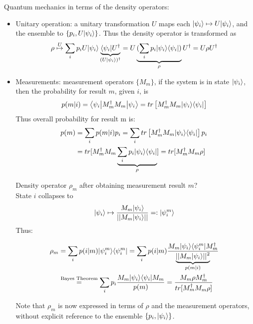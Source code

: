 Quantum mechanics in terms of the density operators:
\begin{itemize}
    \item Unitary operation: a unitary transformation $U$ maps each
    $\lvert\psi_i\rangle \mapsto U \lvert\psi_i\rangle$, and the ensemble to  $\{p_i, U \lvert\psi_i\rangle \}$.
    Thus the density operator is transformed as 
    \begin{equation}
        \rho \stackrel{U}{\mapsto} \sum_i p_i U \lvert\psi_i\rangle 
            \underbrace{\langle\psi_i\rvert U^\dag}_{(U\lvert\psi_i\rangle)^\dag} 
        = U \underbrace{(\sum_i p_i \lvert\psi_i\rangle \langle\psi_i\rvert)}_{\rho} U^\dag 
        = U \rho U^\dag
    \end{equation}

    \item Measurements: measurement operators $\{M_m\}$, if the system is in state
    $\lvert\psi_i\rangle$, then the probability for result $m$, given $i$, is 
    \begin{equation}
        p(m|i) = \left \langle \psi_i \middle| M_m^\dag M_m \middle| \psi_i \right \rangle = 
            tr \left[ M_m^\dag M_m \lvert\psi_i\rangle \langle\psi_i\rvert \right]
    \end{equation}
    Thus overall probability for result m is:
    \begin{align}
        p(m) &= \sum_i p(m|i) p_i = 
            \sum_i tr \left[ M_m^\dag M_m \lvert\psi_i\rangle \langle\psi_i\rvert \right] p_i \\
            &= tr [ M_m^\dag M_m \underbrace{\sum_i p_i \lvert\psi_i\rangle \langle\psi_i\rvert}_{\rho}] 
            = tr [M_m^\dag M_m \rho]
    \end{align}

    Density operator $\rho_m$ after obtaining measurement result $m$? \\
    State $i$ collapses to 
    \begin{equation}
    \lvert\psi_i\rangle \mapsto \frac{M_m \lvert\psi_i\rangle}{|| M_m \lvert\psi_i\rangle||} =: \lvert\psi_i^m\rangle
    \end{equation}
    Thus:
    
    \begin{align}
        \rho_m &= \sum_i p(i|m) \lvert\psi_i^m\rangle \langle\psi_i^m\rvert 
            = \sum_i p(i|m) \frac{M_m \lvert\psi_i\rangle \langle\psi_i^m\rvert M_m^\dag}
            {\underbrace{|| M_m \lvert\psi_i\rangle||^2}_{p(m|i)}} \\
            &\stackrel{\text{Bayes Theorem}}{=} \sum_i p_i \frac{M_m \lvert\psi_i\rangle \langle\psi_i\rvert M_m}{p(m)}
            = \frac{M_m \rho M_m^\dag}{tr[M_m^\dag M_m \rho]}
    \end{align}

    Note that $\rho_m$ is now expressed in terms of $\rho$ and the measurement
    operators, without explicit reference to the ensemble $\{p_i, \lvert\psi_i\rangle \}$.
\end{itemize}

